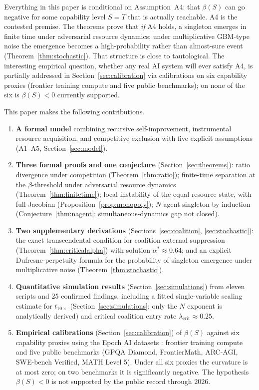 \documentclass[11pt,letterpaper]{article}
\theoremstyle{plain}
\theoremstyle{definition}
\theoremstyle{remark}
\begin{document}
Everything in this paper is conditional on Assumption~A4: that $\beta(S)$
can go negative for some capability level $S = T$ that is actually reachable.
A4 is the contested premise.
The theorems prove that \emph{if} A4 holds, a singleton emerges in
finite time under adversarial resource dynamics; under multiplicative
GBM-type noise the emergence becomes a high-probability rather than
almost-sure event (Theorem~\ref{thm:stochastic}).
That structure is close to tautological.
The interesting empirical question, whether any real AI system will ever
satisfy A4, is partially addressed in Section~\ref{sec:calibration} via
calibrations on six capability proxies (frontier training compute and
five public benchmarks); on none of the six is $\beta(S) < 0$ currently
supported.

This paper makes the following contributions.

\begin{enumerate}[label=(\arabic*)]
\item \textbf{A formal model} combining recursive self-improvement, instrumental
resource acquisition, and competitive exclusion with five explicit assumptions
(A1--A5, Section~\ref{sec:model}).

\item \textbf{Three formal proofs and one conjecture}
(Section~\ref{sec:theorems}):
ratio divergence under competition (Theorem~\ref{thm:ratio});
finite-time separation at the $\beta$-threshold under adversarial resource
dynamics (Theorem~\ref{thm:finitetime});
local instability of the equal-resource state, with full Jacobian
(Proposition~\ref{prop:monopoly});
$N$-agent singleton by induction
(Conjecture~\ref{thm:nagent}: simultaneous-dynamics gap not closed).

\item \textbf{Two supplementary derivations} (Sections~\ref{sec:coalition},
\ref{sec:stochastic}):
the exact transcendental condition for coalition external suppression
(Theorem~\ref{thm:criticalalpha}) with solution $\alpha^* \approx 0.64$;
and an explicit Dufresne-perpetuity formula for the probability of
singleton emergence under multiplicative noise
(Theorem~\ref{thm:stochastic}).

\item \textbf{Quantitative simulation results} (Section~\ref{sec:simulations})
from eleven scripts and 25 confirmed findings, including a fitted single-variable
scaling estimate for $t_{10\times}$ (Section~\ref{sec:simulations}; only the $N$
exponent is analytically derived) and critical coalition entry rate
$\lambda_{\mathrm{crit}} \approx 0.25$.

\item \textbf{Empirical calibrations} (Section~\ref{sec:calibration}) of
$\beta(S)$ against six capability proxies using the Epoch AI datasets
\citep{epoch2024compute}: frontier training compute and five public
benchmarks (GPQA Diamond, FrontierMath, ARC-AGI, SWE-bench Verified,
MATH Level 5).
Under all six proxies the curvature is at most zero; on two benchmarks
it is significantly negative.
The hypothesis $\beta(S) < 0$ is not supported by the public record
through $2026$.
\end{enumerate}
\end{document}
